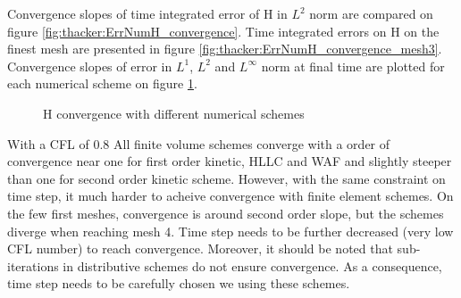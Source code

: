 Convergence slopes of time integrated error of H in $L^2$ norm are compared on figure \ref{fig:thacker:ErrNumH_convergence}.
Time integrated errors on H on the finest mesh are presented in figure \ref{fig:thacker:ErrNumH_convergence_mesh3}.
Convergence slopes of error in $L^1$, $L^2$ and $L^\infty$ norm at final time
are plotted for each numerical scheme on figure \ref{t2d:thacker:mesh_convergence_H}.

\begin{figure}[H]
\begin{minipage}[t]{0.50\textwidth}
 \centering
\end{minipage}%
\begin{minipage}[t]{0.50\textwidth}
 \centering
\end{minipage}
\begin{minipage}[t]{0.50\textwidth}
 \centering
\end{minipage}%
\begin{minipage}[t]{0.50\textwidth}
 \centering
\end{minipage}
\begin{minipage}[t]{0.50\textwidth}
 \centering
\end{minipage}%
\begin{minipage}[t]{0.50\textwidth}
 \centering
\end{minipage}
\begin{minipage}[t]{0.50\textwidth}
 \centering
\end{minipage}%
\begin{minipage}[t]{0.50\textwidth}
 \centering
\end{minipage}
  \caption{H convergence with different numerical schemes}
 \label{t2d:thacker:mesh_convergence_H}
\end{figure}

With a CFL of $0.8$ All finite volume schemes converge with a order of convergence near one for
first order kinetic, HLLC and WAF and slightly steeper than one for second order kinetic scheme.
However, with the same constraint on time step, it much harder to acheive convergence with finite element schemes.
On the few first meshes, convergence is around second order slope, but the schemes diverge when reaching mesh 4.
Time step needs to be further decreased (very low CFL number) to reach convergence. 
Moreover, it should be noted that sub-iterations in distributive schemes do not ensure convergence. As 
a consequence, time step needs to be carefully chosen we using these schemes.

